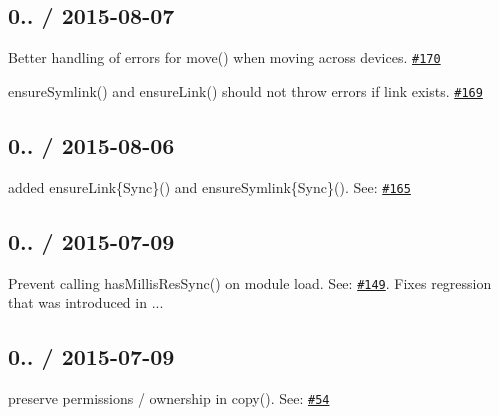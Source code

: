 \subsection*{0.. / 2015-\/08-\/07 }


\begin{DoxyItemize}
\item Better handling of errors for {\ttfamily move()} when moving across devices. \href{https://github.com/jprichardson/node-fs-extra/pull/170}{\tt \#170}
\item {\ttfamily ensure\+Symlink()} and {\ttfamily ensure\+Link()} should not throw errors if link exists. \href{https://github.com/jprichardson/node-fs-extra/pull/169}{\tt \#169}
\end{DoxyItemize}

\subsection*{0.. / 2015-\/08-\/06 }


\begin{DoxyItemize}
\item added {\ttfamily ensure\+Link\{Sync\}()} and {\ttfamily ensure\+Symlink\{Sync\}()}. See\+: \href{https://github.com/jprichardson/node-fs-extra/pull/165}{\tt \#165}
\end{DoxyItemize}

\subsection*{0.. / 2015-\/07-\/09 }


\begin{DoxyItemize}
\item Prevent calling {\ttfamily has\+Millis\+Res\+Sync()} on module load. See\+: \href{https://github.com/jprichardson/node-fs-extra/issues/149}{\tt \#149}. Fixes regression that was introduced in {..}.
\end{DoxyItemize}

\subsection*{0.. / 2015-\/07-\/09 }


\begin{DoxyItemize}
\item preserve permissions / ownership in {\ttfamily copy()}. See\+: \href{https://github.com/jprichardson/node-fs-extra/issues/54}{\tt \#54}
\end{DoxyItemize}

